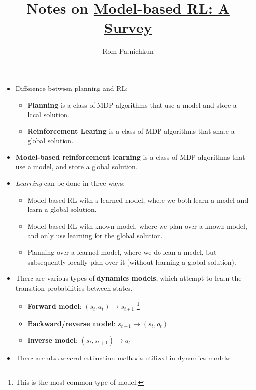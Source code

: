 \documentclass{article}
\theoremstyle{plain}
\begin{document}
\title{Notes on \href{https://arxiv.org/pdf/2006.16712.pdf}{Model-based RL: A Survey}}
\author{Rom Parnichkun}

\maketitle

\begin{itemize}
    \item Difference between planning and RL:
        \begin{itemize}[nolistsep]
            \item \textbf{Planning} is a class of MDP algorithms that use a model and store a local solution.
            \item \textbf{Reinforcement Learing} is a class of MDP algorithms that share a global solution.
        \end{itemize}
    \item \textbf{Model-based reinforcement learning} is a class of MDP algorithms that use a model, and store a global solution.
    \item \textit{Learning} can be done in three ways:
        \begin{itemize}[nolistsep]
            \item Model-based RL with a learned model, where we both learn a model and learn a global solution.
            \item Model-based RL with known model, where we plan over a known model, and only use learning for the global solution.
            \item Planning over a learned model, where we do lean a model, but subsequently locally plan over it (without learning a global solution).
        \end{itemize}
    \item There are various types of \textbf{dynamics models}, which attempt to learn the transition probabilities between states.
        \begin{itemize}[nolistsep]
            \item \textbf{Forward model}: $(s_t, a_t) \rightarrow s_{t+1}$ \footnote{This is the most common type of model.}
            \item \textbf{Backward/reverse model}: $s_{t+1} \rightarrow (s_t, a_t)$
            \item \textbf{Inverse model}: $(s_t, s_{t+1}) \rightarrow a_t$
        \end{itemize}
    \item There are also several estimation methods utilized in dynamics models:

\end{itemize}
\end{document}
